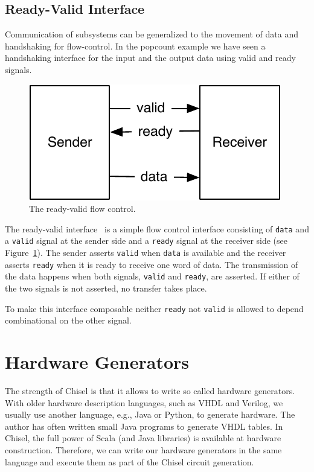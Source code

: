 \documentclass[%
    10pt,
    headinclude, footexclude,
    openright, %
    notitlepage,
    cleardoubleempty,
    headsepline,
    pointlessnumbers,
    bibtotoc, idxtotoc,
    ]{scrbook}
\newcommand{\code}[1]{{\small{\texttt{#1}}}}
\newcommand{\scale}{0.7}
\newcommand{\todo}[1]{{\emph{TODO: #1}}}
\renewcommand{\todo}[1]{}
\begin{document}

\section{Ready-Valid Interface}

Communication of subsystems can be generalized to the movement
of data and handshaking for flow-control. In the popcount example
we have seen a handshaking interface for the input and the output data
using valid and ready signals.

\begin{figure}
  \centering
  \includegraphics[scale=\scale]{figures/readyvalid}
  \caption{The ready-valid flow control.}
  \label{fig:readyvalid}
\end{figure}

The ready-valid interface~\cite[p.~480]{dally:vhdl:2016} is a simple flow
control interface consisting of \code{data} and a \code{valid} signal at the
sender side and a \code{ready} signal at the receiver side (see
Figure~\ref{fig:readyvalid}). The sender asserts \code{valid} when \code{data} is available
and the receiver asserts \code{ready} when it is ready to receive one word
of data. The transmission of the data happens when both signals, \code{valid}
and \code{ready}, are asserted. If either of the two signals is not asserted,
no transfer takes place.

To make this interface composable neither \code{ready} not \code{valid} is
allowed to depend combinational on the other signal.

\todo{Read and cite AXI}

\chapter{Hardware Generators}

The strength of Chisel is that it allows to write so called hardware generators.
With older hardware description languages, such as VHDL and Verilog,
we usually use another language, e.g., Java or Python, to generate hardware.
The author has often written small Java programs to generate VHDL tables.
In Chisel, the full power of Scala (and Java libraries) is available at hardware
construction. Therefore, we can write our hardware generators in the same
language and execute them as part of the Chisel circuit generation.
\end{document}
